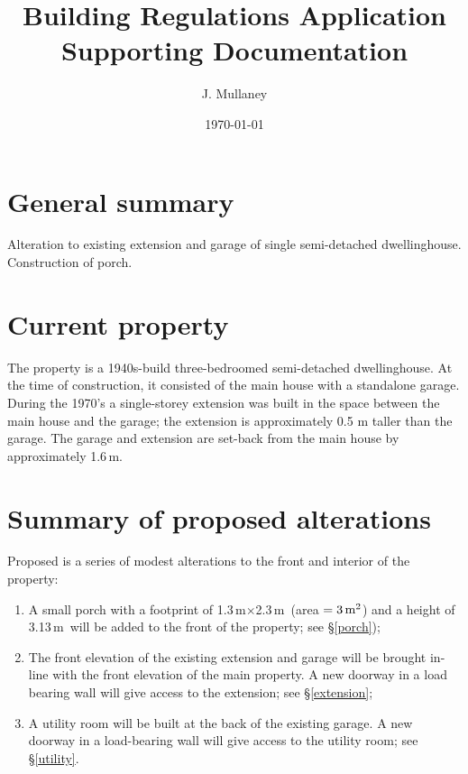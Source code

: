 \documentclass{extension}
\newcommand{\m}{\,$\mathrm{m}$}
\begin{document}
\title{Building Regulations Application \\[2mm]
Supporting Documentation}
\author{J. Mullaney}
\date{\today}

\maketitle

\vspace{5mm}
\section{General summary}
Alteration to existing extension and garage of single semi-detached dwellinghouse. Construction of porch.

\section{Current property}
The property is a 1940s-build three-bedroomed semi-detached dwellinghouse. At the time of construction, it consisted of the main house with a standalone garage. During the 1970’s a single-storey extension was built in the space between the main house and the garage; the extension is approximately 0.5 m taller than the garage. The garage and extension are set-back from the main house by approximately 1.6\,m.

\section{Summary of proposed alterations}
Proposed is a series of modest alterations to the front and interior of the property:
\begin{enumerate}
  \item A small porch with a footprint of 1.3\m$\times$2.3\m\ (area $=3\,{\rm m^2}$) and a height of 3.13\m\ will be added to the front of the property; see \S\ref{porch});
  \item The front elevation of the existing extension and garage will be brought in-line with the front elevation of the main property. A new doorway in a load bearing wall will give access to the extension; see \S\ref{extension};\\
  \item A utility room will be built at the back of the existing garage. A new doorway in a load-bearing wall will give access to the utility room; see \S\ref{utility}.
\end{enumerate}
\end{document}
